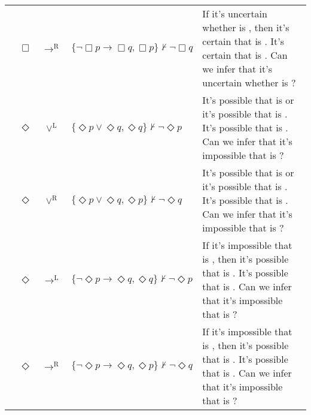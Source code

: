 \begin{tabular}{
  @{}ccclp{}@{}
  }
& $\Box$ & $\rightarrow^{\mathrm{R}}$ & $\{\lnot \Box p \to \Box q, \Box p\} \nvdash \lnot \Box q$ & 
   If it's uncertain whether \subjectA{} is \vpA{}, then it's certain that \subjectB{} is \vpB{}.\newline
  It's certain that \subjectA{} is \vpA{}.\newline
  Can we infer that it's uncertain whether \subjectB{} is \vpB{}? \\
& $\Diamond$ & $\lor^{\mathrm{L}}$ & $\{\Diamond p \lor \Diamond q, \Diamond q\} \nvdash \lnot \Diamond p$ & 
   It's possible that \subjectA{} is \vpA{} or it's possible that \subjectB{} is \vpB{}.\newline
  It's possible that \subjectB{} is \vpB{}.\newline
  Can we infer that it's impossible that \subjectA{} is \vpA{}? \\
& $\Diamond$ & $\lor^{\mathrm{R}}$ & $\{\Diamond p \lor \Diamond q, \Diamond p\} \nvdash \lnot \Diamond q$ & 
   It's possible that \subjectA{} is \vpA{} or it's possible that \subjectB{} is \vpB{}.\newline
  It's possible that \subjectA{} is \vpA{}.\newline
  Can we infer that it's impossible that \subjectB{} is \vpB{}? \\
& $\Diamond$ & $\rightarrow^{\mathrm{L}}$ & $\{\lnot \Diamond p \to \Diamond q, \Diamond q\} \nvdash \lnot \Diamond p$ & 
   If it's impossible that \subjectA{} is \vpA{}, then it's possible that \subjectB{} is \vpB{}.\newline
  It's possible that \subjectB{} is \vpB{}.\newline
  Can we infer that it's impossible that \subjectA{} is \vpA{}? \\
& $\Diamond$ & $\rightarrow^{\mathrm{R}}$ & $\{\lnot \Diamond p \to \Diamond q, \Diamond p\} \nvdash \lnot \Diamond q$ & 
   If it's impossible that \subjectA{} is \vpA{}, then it's possible that \subjectB{} is \vpB{}.\newline
  It's possible that \subjectA{} is \vpA{}.\newline
  Can we infer that it's impossible that \subjectB{} is \vpB{}? \\
\end{tabular}